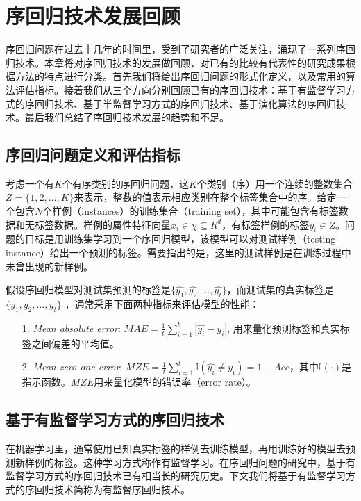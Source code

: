 \chapter{序回归技术发展回顾}
\label{chap:review}
序回归问题在过去十几年的时间里，受到了研究者的广泛关注，涌现了一系列序回归技术。本章将对序回归技术的发展做回顾，对已有的比较有代表性的研究成果根据方法的特点进行分类。首先我们将给出序回归问题的形式化定义，以及常用的算法评估指标。接着我们从三个方向分别回顾已有的序回归技术：基于有监督学习方式的序回归技术、基于半监督学习方式的序回归技术、基于演化算法的序回归技术。最后我们总结了序回归技术发展的趋势和不足。

\section{序回归问题定义和评估指标}
考虑一个有\(K\)个有序类别的序回归问题，这\(K\)个类别（序）用一个连续的整数集合 \(Z=\{1,2,\dots,K\}\)来表示，整数的值表示相应类别在整个标签集合中的序。给定一个包含\(N\)个样例（instances）的训练集合（training set），其中可能包含有标签数据和无标签数据。样例的属性特征向量\(x_{i} \in \chi \subseteq R^{d}\)，有标签样例的标签\(y_{i} \in Z\)。问题的目标是用训练集学习到一个序回归模型，该模型可以对测试样例（testing instance）给出一个预测的标签。需要指出的是，这里的测试样例是在训练过程中未曾出现的新样例。


假设序回归模型对测试集预测的标签是\(\{\hat{y_{1}},\hat{y_{2}},\dots,\hat{y_{t}}\}\)，而测试集的真实标签是 \(\{y_{1},y_{2},\dots,y_{t}\}\) ，通常采用下面两种指标来评估模型的性能：
\begin{enumerate}
\item[1.] \textit{Mean absolute error}: \(MAE=\frac{1}{t}\sum_{i=1}^{t}|\hat{y_{i}}-y_{i}|\), 用来量化预测标签和真实标签之间偏差的平均值。
\item[2.] \textit{Mean zero-one error}: \(MZE=\frac{1}{t}\sum_{i=1}^{t}\mathbb{I}(\hat{y_{i}}\neq y_{i}) = 1-Acc\)，其中\(\mathbb{I}(\cdot)\)是指示函数。\(MZE\)用来量化模型的错误率（error rate）。
\end{enumerate}

\section{基于有监督学习方式的序回归技术}
在机器学习里，通常使用已知真实标签的样例去训练模型，再用训练好的模型去预测新样例的标签。这种学习方式称作有监督学习。在序回归问题的研究中，基于有监督学习方式的序回归技术已有相当长的研究历史。下文我们将基于有监督学习方式的序回归技术简称为有监督序回归技术。

